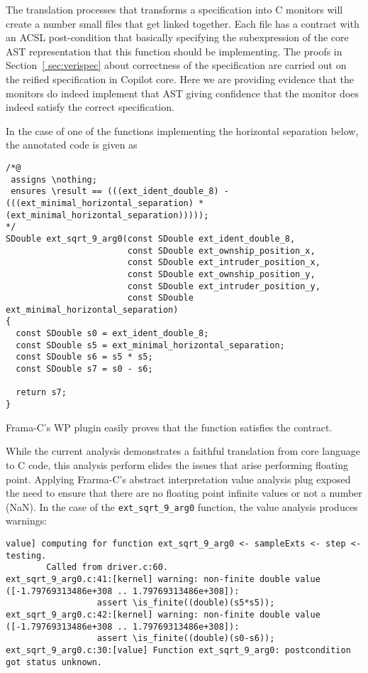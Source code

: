 The translation processes that transforms  a specification  into C monitors will create a number small files
that get linked together. Each file has a contract  with an ACSL 
post-condition that basically specifying the subexpression of the core
AST representation that this function should be  implementing. 
The proofs in Section~\ref{ sec:verispec}  about correctness of the
specification are carried out on the reified specification in Copilot
core. Here we are providing evidence that the monitors do indeed
implement that AST giving confidence that the monitor does indeed
satisfy the correct specification. 

In the case of one of the functions implementing
the horizontal separation below, the annotated code is given as 

\begin{lstlisting}[frame=single]
/*@
 assigns \nothing;
 ensures \result == (((ext_ident_double_8) - (((ext_minimal_horizontal_separation) * (ext_minimal_horizontal_separation)))));
*/
SDouble ext_sqrt_9_arg0(const SDouble ext_ident_double_8,
                        const SDouble ext_ownship_position_x,
                        const SDouble ext_intruder_position_x,
                        const SDouble ext_ownship_position_y,
                        const SDouble ext_intruder_position_y,
                        const SDouble ext_minimal_horizontal_separation)
{
  const SDouble s0 = ext_ident_double_8;
  const SDouble s5 = ext_minimal_horizontal_separation;
  const SDouble s6 = s5 * s5;
  const SDouble s7 = s0 - s6;

  return s7;
}
\end{lstlisting}

\noindent
Frama-C's WP plugin easily proves that the function satisfies the
contract. 

While the current analysis demonstrates a faithful translation from
core language to C code, this analysis perform elides the issues that
arise performing floating point. Applying Frarma-C's abstract
interpretation value analysis plug exposed the need to ensure that
there are no floating point infinite values  or not a number (NaN).
In the case of the \texttt{ext\_sqrt\_9\_arg0} function, the value
analysis produces warnings:
\begin{lstlisting}[frame=single]
value] computing for function ext_sqrt_9_arg0 <- sampleExts <- step <- testing.
        Called from driver.c:60.
ext_sqrt_9_arg0.c:41:[kernel] warning: non-finite double value ([-1.79769313486e+308 .. 1.79769313486e+308]):
                  assert \is_finite((double)(s5*s5));
ext_sqrt_9_arg0.c:42:[kernel] warning: non-finite double value ([-1.79769313486e+308 .. 1.79769313486e+308]):
                  assert \is_finite((double)(s0-s6));
ext_sqrt_9_arg0.c:30:[value] Function ext_sqrt_9_arg0: postcondition got status unknown.
\end{lstlisting}

